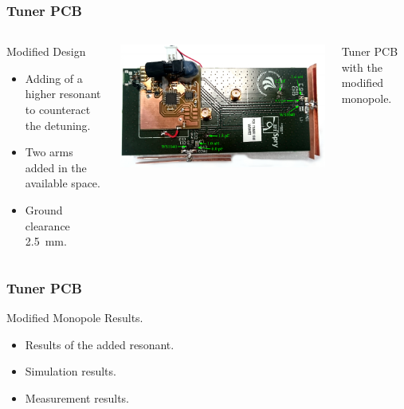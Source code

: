 \begin{frame}[fragile]
    \frametitle{Tuner PCB}
    \begin{columns}[onlytextwidth,t]
        \begin{block}{Modified Design}
          \begin{itemize}
          \item Adding of a higher resonant to counteract the detuning.
          \item Two arms added in the available space. 
          \item Ground clearance \SI{2.5}{mm}.
          \end{itemize}
        \end{block}
        \begin{center}
            \includegraphics[scale=0.33]{img/Lasse/lassedouble.pdf}
        \end{center}
        Tuner PCB with the modified monopole.
    \end{columns}
\end{frame}

\begin{frame}
  \frametitle{Tuner PCB}
    \begin{block}{Modified Monopole Results.}
      \begin{itemize}
      \item Results of the added resonant.
      \item Simulation results.
      \item Measurement results.
      \end{itemize}
    \end{block}
\end{frame}

